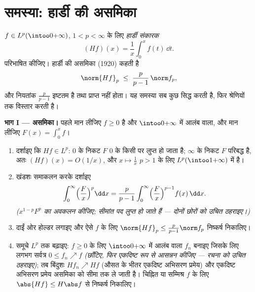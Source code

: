 \section{समस्या: हार्डी की असमिका}

\begin{problem}\label{pb:b3:lp:1}
$f \in L^p(\intoo0{+\infty})$, $1 < p < \infty$ के लिए \emph{हार्डी संकारक}
\[
(Hf)(x) = \frac1x\int_0^x f(t)\,\dd t .
\]
परिभाषित कीजिए। हार्डी की असमिका (1920) कहती है
\[
\norm{Hf}_p \;\leq\; \frac{p}{p-1}\,\norm f_p ,
\]
और नियतांक $\frac p{p-1}$ इष्टतम है तथा प्राप्त नहीं होता। यह समस्या सब
कुछ सिद्ध करती है, फिर श्रेणियों तक विस्तार करती है।

\medskip
\noindent\textbf{भाग I --- असमिका।} पहले मान लीजिए $f
\geq 0$  है
और $\intoo0{+\infty}$ में  आलंब वाला, और मान लीजिए $F(x) = \int_0^xf$।
\begin{enumerate}
  \item दर्शाइए कि $Hf \in L^p$: $0$ के निकट $F$ $0$ के किसी
         पर लुप्त हो जाता है; $\infty$ के निकट $F$ परिबद्ध
        है, अतः $(Hf)(x) = O(1/x)$, और $x \mapsto \frac1x$ $p > 1$ के लिए $L^p(\intoo1{+\infty})$ में है।
  \item खंडशः समाकलन करके दर्शाइए
        \[
        \int_0^\infty \Bigl(\frac Fx\Bigr)^p\dd x
        = \frac{p}{p-1}\int_0^\infty\Bigl(\frac
        Fx\Bigr)^{p-1}f(x)\,\dd x .
        \]
        \emph{($x^{1-p}F^p$ का अवकलन कीजिए; सीमांत पद लुप्त हो जाते हैं
        --- दोनों छोरों को उचित ठहराइए।)}
  \item दाईं ओर होल्डर लगाइए और ऐसे $f$ के लिए $\norm{Hf}_p \leq \frac p{p-1}\norm f_p$ निष्कर्ष
        निकालिए।
  \item समूचे $L^p$ तक बढ़ाइए: $f \geq 0$ के लिए $\intoo0{+\infty}$ में  आलंब
        वाला  $f_n$ बनाइए जिसके लिए लगभग सर्वत्र $0 \leq f_n \nearrow f$
        \emph{(छाँटिए, फिर एकदिष्ट रूप से आसन्नन कीजिए --- रचना
        को उचित ठहराइए)}; तब बिंदुशः $Hf_n \nearrow Hf$ (औसत के भीतर एकदिष्ट
        अभिसरण प्रमेय) और एकदिष्ट अभिसरण प्रमेय असमिका को सीमा
        तक ले जाती है। चिह्नित या सम्मिश्र $f$ के लिए $\abs{Hf} \leq H\abs f$ से
        निष्कर्ष निकालिए।
\end{enumerate}


\end{problem}
